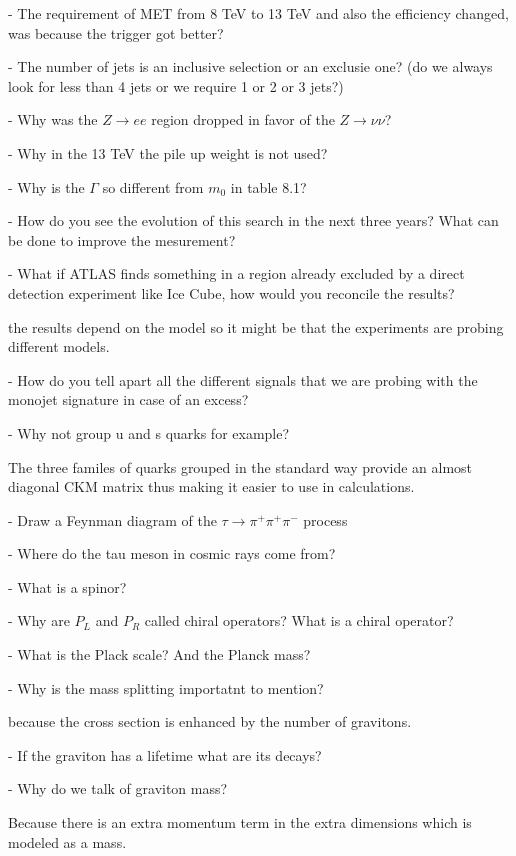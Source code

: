 \documentclass[a4paper,10pt,twoside,notitlepage]{article}
\begin{document}
\begin{description}
  - The requirement of MET from 8 TeV to 13 TeV and also the efficiency changed,
  was because the trigger got better?

  - The number of jets is an inclusive selection or an exclusie one? (do we
  always look for less than 4 jets or we require 1 or 2 or 3 jets?)

  - Why was the $Z \to ee$ region dropped in favor of the $Z \to \nu \nu$?

  - Why in the 13 TeV the pile up weight is not used?

  - Why is the $\Gamma$ so different from $m_0$ in table 8.1?

  - How do you see the evolution of this search in the next three years? What
  can be done to improve the mesurement?

  - What if ATLAS finds something in a region already excluded by a direct
  detection experiment like Ice Cube, how would you reconcile the results?

  the results depend on the model so it might be that the experiments are
  probing different models.

  - How do you tell apart all the different signals that we are probing with the
  monojet signature in case of an excess?


  - Why not group u and s quarks for example?

  The three familes of quarks grouped in the standard way provide an almost
  diagonal CKM matrix thus making it easier to use in calculations.

  - Draw a Feynman diagram of the $\tau \to \pi^+ \pi^+ \pi^-$ process

  - Where do the tau meson in cosmic rays come from?

  - What is a spinor?

  - Why are $P_L$ and $P_R$ called chiral operators? What is a chiral operator?

  - What is the Plack scale? And the Planck mass?

  - Why is the mass splitting importatnt to mention?

  because the cross section is enhanced by the number of gravitons.

  - If the graviton has a lifetime what are its decays?

  - Why do we talk of graviton mass?

  Because there is an extra momentum term in the extra dimensions which is
  modeled as a mass.


\end{description}
\end{document}
